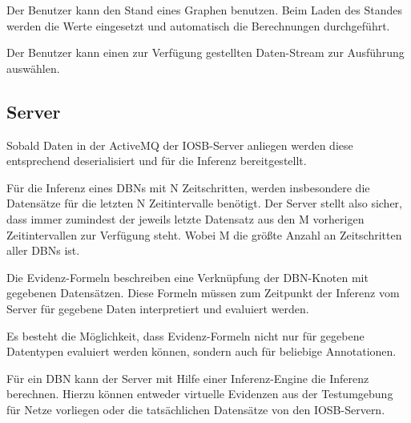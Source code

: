\documentclass[parskip=full,11pt,twoside]{scrartcl}
\begin{document}


Der Benutzer kann den Stand eines Graphen benutzen. Beim Laden des Standes werden die Werte eingesetzt und automatisch die Berechnungen durchgeführt.


Der Benutzer kann einen zur Verfügung gestellten Daten-Stream zur Ausführung auswählen.

\subsection{Server}


Sobald Daten in der \gls{ActiveMQ} der IOSB-Server anliegen werden diese entsprechend deserialisiert und für die Inferenz bereitgestellt.

Für die Inferenz eines DBNs mit N Zeitschritten, werden insbesondere die Datensätze für die letzten N Zeitintervalle benötigt. Der Server stellt also sicher, dass immer zumindest der jeweils letzte Datensatz aus den M vorherigen Zeitintervallen zur Verfügung steht. Wobei M die größte Anzahl an Zeitschritten aller DBNs ist.

Die Evidenz-Formeln beschreiben eine Verknüpfung der DBN-Knoten mit gegebenen Datensätzen. Diese Formeln müssen zum Zeitpunkt der Inferenz vom Server für gegebene Daten interpretiert und evaluiert werden.

Es besteht die Möglichkeit, dass Evidenz-Formeln nicht nur für gegebene Datentypen evaluiert werden können, sondern auch für beliebige Annotationen.

Für ein DBN kann der Server mit Hilfe einer Inferenz-Engine die Inferenz berechnen. Hierzu können entweder virtuelle Evidenzen aus der Testumgebung für Netze vorliegen oder die tatsächlichen Datensätze von den IOSB-Servern.
\end{document}

